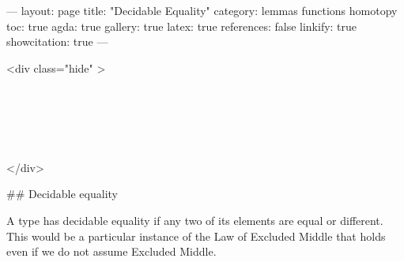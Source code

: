 ---
layout: page
title: "Decidable Equality"
category: lemmas functions homotopy
toc: true
agda: true
gallery: true
latex: true
references: false
linkify: true
showcitation: true
---

<div class="hide" >
\begin{code}%
\>[0]\AgdaSymbol{\{-\#}\AgdaSpace{}%
\AgdaSpace{}%
\AgdaSpace{}%
\AgdaSymbol{\#-\}}\<%
\\
\>[0]\AgdaSpace{}%
\AgdaSpace{}%
\<%
\\
\>[0]\AgdaSpace{}%
\AgdaSpace{}%
\<%
\\
\>[0]\AgdaSpace{}%
\AgdaSpace{}%
\<%
\\
\>[0]\AgdaSpace{}%
\AgdaSpace{}%
\<%
\end{code}
</div>


## Decidable equality

A type has decidable equality if any two of its
elements are equal or different. This would be a particular
instance of the Law of Excluded Middle that holds even if we do not
assume Excluded Middle.

